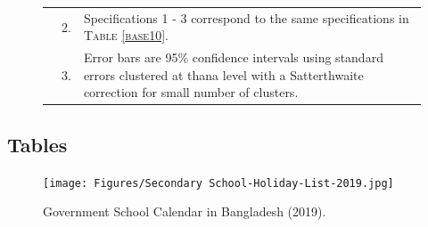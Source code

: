 \documentclass[12pt,letterpaper]{article}\usepackage[margin=1in]{geometry}
\newcommand{\0}{\ensuremath{\mbox{\boldmath $0$}}}
\begin{document}
{\begin{figure}
\begin{tabular}{>{\hfill\scriptsize}p{1cm}<{}>{\hfill\scriptsize}p{.5cm}<{}>{\scriptsize}p{11cm}<{\hfill}}
& 2. & Specifications 1 - 3 correspond to the same specifications in \textsc{Table \ref{base10}}. \\[-1ex]
& 3. & Error bars are 95\% confidence intervals using standard errors clustered at thana level with a Satterthwaite correction for small number of clusters.
\end{tabular}
\end{figure}

\clearpage
\subsection{Tables}


\begin{figure}[ht!]
\centering
\texttt{[image: Figures/Secondary School-Holiday-List-2019.jpg]}\\
\caption{Government School Calendar in Bangladesh (2019).\protect\footnotemark}
\label{school_calander_2019}
\end{figure}


\pagebreak

}
\end{document}
